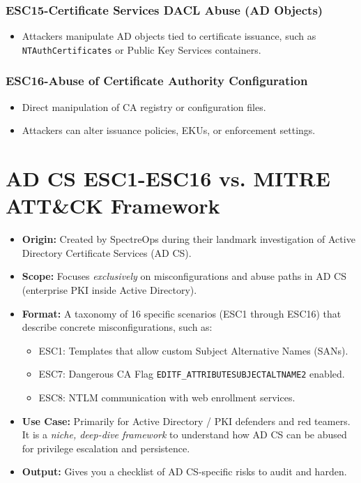 {\begin{itemiz3
021e}
\subsubsection{ESC15-Certificate Services DACL Abuse (AD Objects)}
\begin{itemize}
    \item Attackers manipulate AD objects tied to certificate issuance, such as \texttt{NTAuthCertificates} or Public Key Services containers.
\end{itemize}

\subsubsection{ESC16-Abuse of Certificate Authority Configuration}
\begin{itemize}
    \item Direct manipulation of CA registry or configuration files.
    \item Attackers can alter issuance policies, EKUs, or enforcement settings.
\end{itemize}

\section{AD CS ESC1-ESC16 vs. MITRE ATT\&CK Framework}
\begin{itemize}
    \item \textbf{Origin:} Created by SpectreOps during their landmark investigation of Active Directory Certificate Services (AD CS).
    \item \textbf{Scope:} Focuses \textit{exclusively} on misconfigurations and abuse paths in AD CS (enterprise PKI inside Active Directory).
    \item \textbf{Format:} A taxonomy of 16 specific scenarios (ESC1 through ESC16) that describe concrete misconfigurations, such as: \begin{itemize}
        \item ESC1: Templates that allow custom Subject Alternative Names (SANs).
        \item ESC7: Dangerous CA Flag \texttt{EDITF\_ATTRIBUTESUBJECTALTNAME2} enabled.
        \item ESC8: NTLM communication with web enrollment services.
    \end{itemize}
\item \textbf{Use Case:} Primarily for Active Directory / PKI defenders and red teamers. It is a \textit{niche, deep-dive framework} to understand how AD CS can be abused for privilege escalation and persistence.
\item \textbf{Output:} Gives you a checklist of AD CS-specific risks to audit and harden.
\end{itemize}


\end{itemiz3
021e}}
